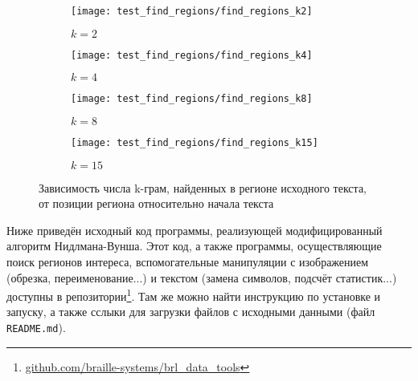 \documentclass{main.tex}[subfiles]
\begin{document}
\newpage
{}

\begin{figure}[H]
    \centering
    \begin{subfigure}{.5\textwidth}
        \centering
        \texttt{[image: test\_find\_regions/find\_regions\_k2]}
        \caption{$ k = 2 $}
    \end{subfigure}%
    \begin{subfigure}{.5\textwidth}
        \centering
        \texttt{[image: test\_find\_regions/find\_regions\_k4]}
        \caption{$ k = 4 $}
    \end{subfigure}

    \begin{subfigure}{.5\textwidth}
        \centering
        \texttt{[image: test\_find\_regions/find\_regions\_k8]}
        \caption{$ k = 8 $}
    \end{subfigure}%
    \begin{subfigure}{.5\textwidth}
        \centering
        \texttt{[image: test\_find\_regions/find\_regions\_k15]}
        \caption{$ k = 15 $}
    \end{subfigure}
    \caption{Зависимость числа k-грам, найденных в регионе исходного текста, от позиции региона относительно начала текста}
    \label{fig:find_k}
\end{figure}


\newpage
{}
Ниже приведён исходный код программы, реализующей модифицированный алгоритм Нидлмана-Вунша. %
Этот код, а также программы, осуществляющие поиск регионов интереса, вспомогательные манипуляции с изображением (обрезка, переименование...) и текстом (замена символов, подсчёт статистик...) доступны в репозитории\footnote{\href{https://github.com/braille-systems/brl_data_tools}{github.com/braille-systems/brl\_data\_tools}}.
Там же можно найти инструкцию по установке и запуску, а также сслыки для загрузки файлов с исходными данными (файл \texttt{README.md}).


\end{document}
